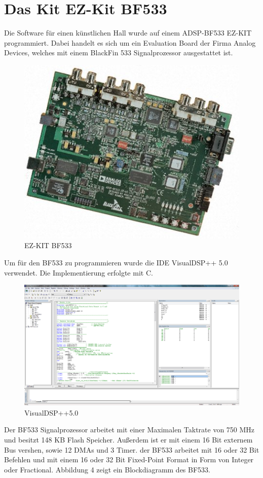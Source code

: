 \documentclass[a4paper,12pt,fontsize=12,DIV=12]{scrartcl}
\begin{document}
\section{Das Kit EZ-Kit BF533}
Die Software für einen künstlichen Hall wurde auf einem ADSP-BF533 EZ-KIT programmiert.
Dabei handelt es sich um ein Evaluation Board der Firma Analog Devices, welches mit einem BlackFin 533 Signalprozessor ausgestattet ist.
\begin{figure}[h]
	\includegraphics[scale=1.5]{Bilder/bf533.jpg}
	\caption{EZ-KIT BF533}
	\label{labelname}
\end{figure}
Um für den BF533 zu programmieren wurde die IDE VisualDSP++ 5.0 verwendet.
Die Implementierung erfolgte mit C.
\begin{figure}[h]
	\includegraphics[scale=0.4]{Bilder/visualdsp50.png}
	\caption{VisualDSP++5.0}
	\label{labelname}
\end{figure}
Der BF533 Signalprozessor arbeitet mit einer Maximalen Taktrate von 750 MHz und besitzt 148 KB Flash Speicher. Außerdem ist er mit einem 16 Bit externem Bus vershen, sowie 12 DMAs und 3 Timer. der BF533 arbeitet mit 16 oder 32 Bit Befehlen und mit einem 16 oder 32 Bit Fixed-Point Format in Form von Integer oder Fractional. Abbildung 4 zeigt ein Blockdiagramm des BF533.
\end{document}
